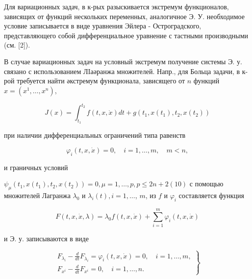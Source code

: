 \documentclass[10pt]{article}
\begin{document}
Для вариационных задач, в к-рых разыскивается экстремум функционалов, зависящих от функций нескольких переменных, аналогичное Э. У. необходимое условие записывается в виде уравнения Эйлера - Остроградского, представляющего собой дифференциальное уравнение с тастными производными (см. [2]).



В случае вариационных задач на условный экстремум получение системы Э. у. связано с использованием ЛIаәранжа множителей. Напр., для Больца задачи, в к-рой требуется найти әкстремум функционала, зависящего от $n$ функций $x=\left(x^{1}, \ldots, x^{n}\right)$,



\[

J(x)=\int_{t_{1}}^{t_{2}} f(t, x, \dot{x}) d t+g\left(t_{1}, x\left(t_{1}\right), t_{2}, x\left(t_{2}\right)\right)

\]



при наличии дифференциальных ограничений типа равенств



\[

\varphi_{i}(t, x, \dot{x})=0, \quad i=1, \ldots, m, \quad m<n,

\]



и граничных условий



$\psi_{\mu}\left(t_{1}, x\left(t_{1}\right), t_{2}, x\left(t_{2}\right)\right)=0, \mu=1, \ldots, p, p \leqslant 2 n+2(10)$ с помощью множителей Лагранжа $\lambda_{0}$ и $\lambda_{i}(t), i=1, \ldots$, $m$, из $f$ и $\varphi_{i}$ составляется функция



\[

F(t, x, \dot{x}, \lambda)=\lambda_{0} f(t, x, \dot{x})+\sum_{i=1}^{m} \varphi_{i}(t, x, \dot{x})

\]



и Э. у. записываются в виде



\[

\left.\begin{array}{l}

F_{\lambda_{i}}-\frac{d}{d t} F_{\dot{\lambda}_{i}}=\varphi_{i}(t, x, \dot{x})=0, \quad i=1, \ldots, m, \\

F_{x^{i}}-\frac{d}{d t} F_{x^{i}}=0, \quad i=1, \ldots, n .

\end{array}\right\}

\]
\end{document}

